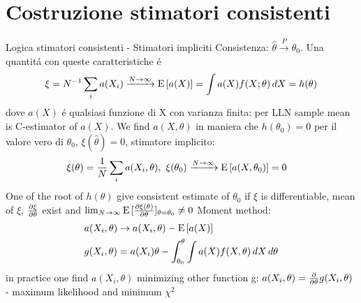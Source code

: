 \section{Costruzione stimatori consistenti}

\begin{frame}{Logica stimatori consistenti - Stimatori impliciti}
Consistenza: $\hat{\theta}\xrightarrow{P}\theta_0$. Una quantit\'a con queste caratteristiche \'e
\[\xi={N}^{-1}\sum_ia(X_i)\xrightarrow{N\to\infty}\operatorname{E}{[a(X)]}=\int a(X)f(X;\theta)\,dX=h(\theta)\]
dove $a(X)$ \'e qualsiasi funzione di X con varianza finita: per LLN sample mean is C-estimator of $a(X)$. We find $a(X,\theta)$ in maniera che $h(\theta_0)=0$ per il valore vero di $\theta_0$, $\xi(\hat{\theta})=0$, stimatore implicito:
\begin{align*}
&\xi(\theta)=\frac{1}{N}\sum_ia(X_i,\theta),\ \xi(\theta_0)\xrightarrow{N\to\infty}\E{[a(X,\theta_0)]}=0
\end{align*}
One of the root of $h(\theta)$ give consistent estimate of $\theta_0$ if $\xi$ is differentiable, mean of $\xi$, $\frac{\partial \xi}{\partial \theta}$ exist and $\lim_{N\to\infty}\operatorname{E}{[\frac{\partial \xi(\theta)}{\partial \theta}]_{\theta=\theta_0}}\neq0$
Moment method:
\begin{align*}
&a(X_i,\theta)\to a(X_i,\theta)-\operatorname{E}{[a(X)]}\\
&g(X_i,\theta)=a(X_i)\theta-\int_{\theta_0}^{\theta}\int a(X)f(X,\theta)\,dX\,d\theta
\end{align*}
in practice one find $a(X_i,\theta)$ minimizing other function g: $a(X_i,\theta)=\frac{\partial}{\partial \theta}g(X_i,\theta)$ - maximum likelihood and minimum $\chi^2$
\end{frame}

